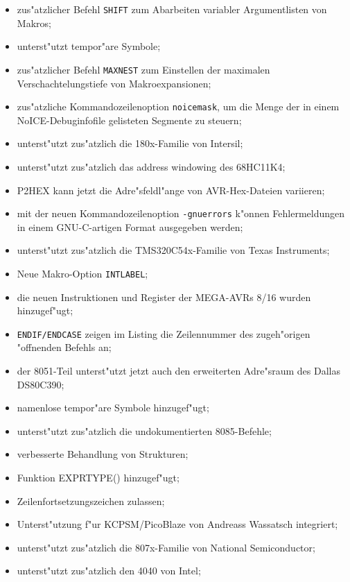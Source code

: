 \documentclass[12pt,a4paper,twoside]{report}
\begin{document}
\begin{itemize}
{\begin{itemize}
      \item{zus"atzlicher Befehl {\tt SHIFT} zum Abarbeiten variabler
            Argumentlisten von Makros;}
      \item{unterst"utzt tempor"are Symbole;}
      \item{zus"atzlicher Befehl {\tt MAXNEST} zum Einstellen der
            maximalen Verschachtelungstiefe von Makroexpansionen;}
      \item{zus"atzliche Kommandozeilenoption {\tt noicemask}, um
            die Menge der in einem NoICE-Debuginfofile gelisteten Segmente
            zu steuern;}
      \item{unterst"utzt zus"atzlich die 180x-Familie von Intersil;}
      \item{unterst"utzt zus"atzlich das address windowing des 68HC11K4;}
      \item{P2HEX kann jetzt die Adre"sfeldl"ange von AVR-Hex-Dateien
            variieren;}
      \item{mit der neuen Kommandozeilenoption {\tt -gnuerrors} k"onnen
            Fehlermeldungen in einem GNU-C-artigen Format ausgegeben
            werden;}
      \item{unterst"utzt zus"atzlich die TMS320C54x-Familie von Texas
            Instruments;}
      \item{Neue Makro-Option {\tt INTLABEL};}
      \item{die neuen Instruktionen und Register der MEGA-AVRs 8/16
            wurden hinzugef"ugt;}
      \item{{\tt ENDIF/ENDCASE} zeigen im Listing die Zeilennummer des
            zugeh"origen "offnenden Befehls an;}
      \item{der 8051-Teil unterst"utzt jetzt auch den erweiterten
            Adre"sraum des Dallas DS80C390;}
      \item{namenlose tempor"are Symbole hinzugef"ugt;}
      \item{unterst"utzt zus"atzlich die undokumentierten 8085-Befehle;}
      \item{verbesserte Behandlung von Strukturen;}
      \item{Funktion EXPRTYPE() hinzugef"ugt;}
      \item{Zeilenfortsetzungszeichen zulassen;}
      \item{Unterst"utzung f"ur KCPSM/PicoBlaze von Andreass Wassatsch
            integriert;}
      \item{unterst"utzt zus"atzlich die 807x-Familie von National
            Semiconductor;}
      \item{unterst"utzt zus"atzlich den 4040 von Intel;}

\end{itemize}}
\end{itemize}
\end{document}
